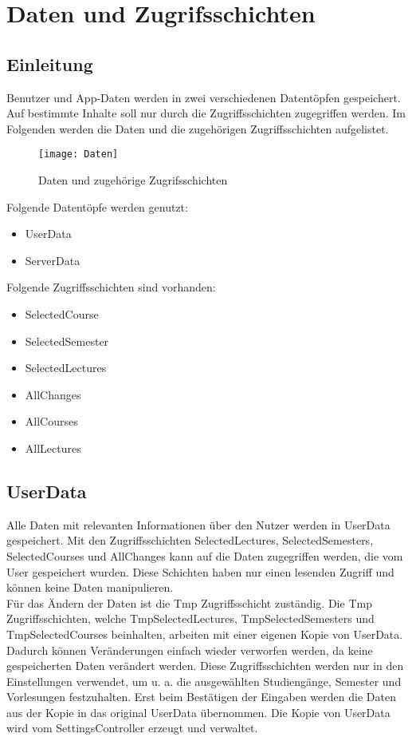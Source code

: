 \chapter{Daten und Zugrifsschichten}
\section{Einleitung}
Benutzer und App-Daten werden in zwei verschiedenen Datentöpfen gespeichert. Auf bestimmte Inhalte soll nur durch die Zugriffsschichten zugegriffen werden. Im Folgenden werden die Daten und die zugehörigen Zugriffsschichten aufgelistet.\\

\begin{figure}[htb]
    \centering
    \texttt{[image: Daten]}
    \caption{Daten und zugehörige Zugrifsschichten}
\end{figure}
\newpage

Folgende Datentöpfe werden genutzt:
\begin{itemize}
     \item UserData
     \item ServerData \\
\end{itemize}

Folgende Zugriffsschichten sind vorhanden:
\begin{itemize}
     \item SelectedCourse
     \item SelectedSemester
     \item SelectedLectures
     \item AllChanges
     \item AllCourses
     \item AllLectures
\end{itemize}

\newpage

\section{UserData}
Alle Daten mit relevanten Informationen über den Nutzer werden in UserData gespeichert. Mit den Zugriffsschichten SelectedLectures, SelectedSemesters, SelectedCourses und AllChanges kann auf die Daten zugegriffen werden, die vom User gespeichert wurden. Diese Schichten haben nur einen lesenden Zugriff und können keine Daten manipulieren. \\

Für das Ändern der Daten ist die Tmp Zugriffsschicht zuständig. Die Tmp Zugriffsschichten, welche TmpSelectedLectures, TmpSelectedSemesters und TmpSelectedCourses beinhalten, arbeiten mit einer eigenen Kopie von UserData. Dadurch können Veränderungen einfach wieder verworfen werden, da keine gespeicherten Daten verändert werden. Diese Zugriffsschichten werden nur in den Einstellungen verwendet, um u. a. die ausgewählten Studiengänge, Semester und Vorlesungen festzuhalten. Erst beim Bestätigen der Eingaben werden die Daten aus der Kopie in das original UserData übernommen. Die Kopie von UserData wird vom SettingsController erzeugt und verwaltet.\\


